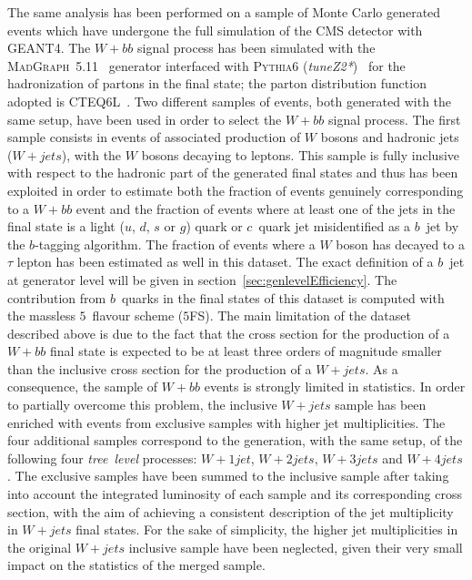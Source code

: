 The same analysis has been performed on a sample of Monte Carlo generated events which 
have undergone the full simulation of the CMS detector with \textsc{GEANT4}.
The $W + bb$ signal process has been simulated with the 
\textsc{MadGraph~5.11}~\cite{MADGRAPH} generator interfaced with \textsc{Pythia6} 
(\textit{tuneZ2*})~\cite{pythia} for the hadronization of partons in the final state; 
the parton distribution function adopted is \textsc{CTEQ6L}~\cite{cteq}.
Two different samples of events, both generated with the same setup, 
have been used in order to select the $W + bb$ signal process.
The first sample consists in events of  associated 
production of $W$ bosons and hadronic jets ($W + jets$),
with the $W$ bosons decaying to leptons.
This sample is fully inclusive with respect 
to the hadronic part of the generated final states and thus 
has been exploited in order to estimate both the fraction of events 
genuinely corresponding to a $W + bb$ event and the fraction of events 
where at least one of the jets in the final state is a light ($u$, $d$, $s$ or $g$) 
quark or $c$~quark jet misidentified as a $b$~jet by the $b$-tagging
algorithm. 
The fraction of events where a $W$ boson has decayed to a $\tau$ 
lepton has been estimated as well in this dataset.
The exact definition of a $b$~jet at generator level will be given in 
section~\ref{sec:genlevelEfficiency}.
The contribution from $b$~quarks in the final states of this dataset
is computed with the massless $5$~flavour scheme ($5$FS).
The main limitation of the dataset described above is due to 
the fact that the
cross section for the production of a $W + bb$ final state
is expected to be at least three orders of magnitude 
smaller than the inclusive cross section for the production 
of a $W + jets$. As a consequence, 
the sample of $W + bb$ events is strongly limited in statistics.
In order to partially overcome this problem,
the inclusive $W + jets$ sample has been enriched with events from exclusive samples
with higher jet multiplicities. The four additional samples 
correspond to the generation, with the same setup, of the following 
four \textit{tree~level} processes: $W + 1 jet$, $W + 2 jets$, 
$W + 3 jets$ and $W + 4 jets$.
The exclusive samples have been summed to the inclusive sample after taking into account the 
integrated luminosity of each sample and its corresponding 
cross section, with the aim of achieving a consistent description of the 
jet multiplicity in $W + jets$ final states. For the sake of simplicity,
the higher jet multiplicities in the original $W + jets$ inclusive sample have 
been neglected, given their very small impact on the statistics of the merged 
sample.

